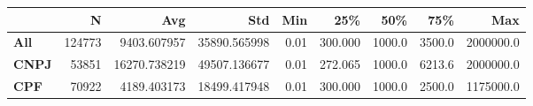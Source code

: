 \begin{tabular}{lrrrrrrrr}
\toprule
{} &      N &           Avg &           Std &   Min &      25\% &     50\% &     75\% &        Max \\
\midrule
\textbf{All } & 124773 &   9403.607957 &  35890.565998 &  0.01 &  300.000 &  1000.0 &  3500.0 &  2000000.0 \\
\textbf{CNPJ} &  53851 &  16270.738219 &  49507.136677 &  0.01 &  272.065 &  1000.0 &  6213.6 &  2000000.0 \\
\textbf{CPF } &  70922 &   4189.403173 &  18499.417948 &  0.01 &  300.000 &  1000.0 &  2500.0 &  1175000.0 \\
\bottomrule
\end{tabular}
